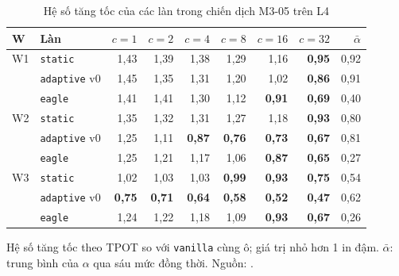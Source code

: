 \begin{table}[htbp]
\centering
\caption{Hệ số tăng tốc của các làn trong chiến dịch M3-05 trên L4}
\label{tab:m3}
\small
\begin{tabular}{@{}llrrrrrrr@{}}
\toprule
\textbf{W} & \textbf{Làn} & $c=1$ & $c=2$ & $c=4$ & $c=8$ & $c=16$ & $c=32$ & $\bar\alpha$ \\
\midrule
W1 & \texttt{static} & 1{,}43 & 1{,}39 & 1{,}38 & 1{,}29 & 1{,}16 & \textbf{0{,}95} & 0{,}92 \\
 & \texttt{adaptive} v0 & 1{,}45 & 1{,}35 & 1{,}31 & 1{,}20 & 1{,}02 & \textbf{0{,}86} & 0{,}91 \\
 & \texttt{eagle} & 1{,}41 & 1{,}41 & 1{,}30 & 1{,}12 & \textbf{0{,}91} & \textbf{0{,}69} & 0{,}40 \\
\midrule
W2 & \texttt{static} & 1{,}35 & 1{,}32 & 1{,}31 & 1{,}27 & 1{,}18 & \textbf{0{,}93} & 0{,}80 \\
 & \texttt{adaptive} v0 & 1{,}25 & 1{,}11 & \textbf{0{,}87} & \textbf{0{,}76} & \textbf{0{,}73} & \textbf{0{,}67} & 0{,}81 \\
 & \texttt{eagle} & 1{,}25 & 1{,}21 & 1{,}17 & 1{,}06 & \textbf{0{,}87} & \textbf{0{,}65} & 0{,}27 \\
\midrule
W3 & \texttt{static} & 1{,}02 & 1{,}03 & 1{,}03 & \textbf{0{,}99} & \textbf{0{,}93} & \textbf{0{,}75} & 0{,}54 \\
 & \texttt{adaptive} v0 & \textbf{0{,}75} & \textbf{0{,}71} & \textbf{0{,}64} & \textbf{0{,}58} & \textbf{0{,}52} & \textbf{0{,}47} & 0{,}62 \\
 & \texttt{eagle} & 1{,}24 & 1{,}22 & 1{,}18 & 1{,}09 & \textbf{0{,}93} & \textbf{0{,}67} & 0{,}26 \\
\bottomrule
\end{tabular}

\vspace{2pt}
{\footnotesize Hệ số tăng tốc theo TPOT so với \texttt{vanilla} cùng ô; giá trị nhỏ hơn 1 in đậm. $\bar\alpha$: trung bình của $\alpha$ qua sáu mức đồng thời. Nguồn: .}
\end{table}
